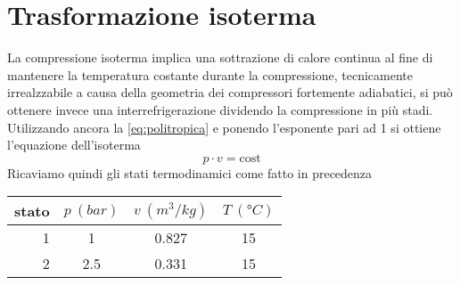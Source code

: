 \documentclass[a4paper,12pt]{article}
\begin{document}
\section{Trasformazione isoterma}
\label{sec:quarta_trasformazione}
La compressione isoterma implica una sottrazione di calore continua al fine di mantenere la temperatura
costante durante la compressione, tecnicamente irrealzzabile a causa della geometria dei compressori
fortemente adiabatici, si può ottenere invece una interrefrigerazione dividendo la compressione in più 
stadi.
Utilizzando ancora la \eqref{eq:politropica} e ponendo l'esponente pari ad 1 si ottiene l'equazione dell'isoterma
\begin{equation}
    p\cdot v = \text{cost}
\end{equation}
Ricaviamo quindi gli stati termodinamici come fatto in precedenza
\begin{center}
    \begin{tabular}{r|c|c|c}
        stato    & $p\ (bar)$ & $v\ (m^3/kg)$ & $T\ (\text{°}C) $\\ \hline
        1   &           1 &          0.827    &           15     \\ \hline
        2   &         2.5 &          0.331    &           15
    \end{tabular}
\end{center}
\end{document}
